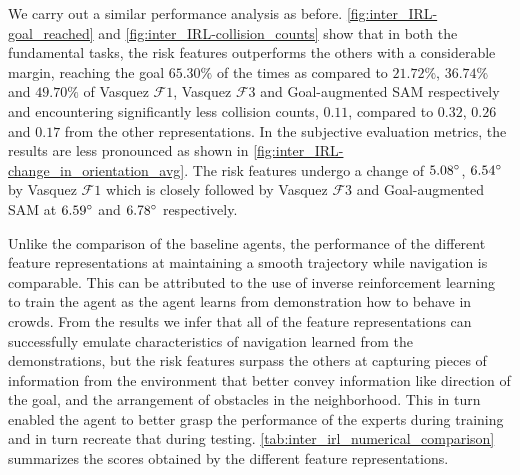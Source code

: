 We carry out a similar performance analysis as before. \autoref{fig:inter_IRL-goal_reached} and \autoref{fig:inter_IRL-collision_counts} show that in both the fundamental tasks, the risk features outperforms the others with a considerable margin, reaching the goal $65.30\%$ of the times as compared to $21.72\%$, $36.74\%$ and $49.70\%$ of Vasquez $\mathcal{F}1$, Vasquez $\mathcal{F}3$ and Goal-augmented SAM respectively and encountering significantly less collision counts, $0.11$, compared to $0.32$, $0.26$ and $0.17$ from the other  representations. In the subjective evaluation metrics, the results are less pronounced as shown in \autoref{fig:inter_IRL-change_in_orientation_avg}. The risk features undergo a change of $5.08\degree$, $6.54\degree$  by Vasquez $\mathcal{F}1$ which is closely followed by Vasquez $\mathcal{F}3$ and Goal-augmented SAM at $6.59\degree$ and $6.78\degree$ respectively. 
\par
Unlike the comparison of the baseline agents, the performance of the different feature representations at maintaining a smooth trajectory while navigation is comparable. This can be attributed to the use of inverse reinforcement learning to train the agent as the agent learns from demonstration how to behave in crowds.  From the results we infer that all of the feature representations can successfully emulate characteristics of navigation learned from the demonstrations, but the risk features surpass the others at capturing pieces of information from the environment that better convey information like direction of the goal, and the arrangement of obstacles in the neighborhood. This in turn enabled the agent to better grasp the performance of the experts during training and in turn recreate that during testing.%
 \autoref{tab:inter_irl_numerical_comparison} summarizes the scores obtained by the different feature representations.

